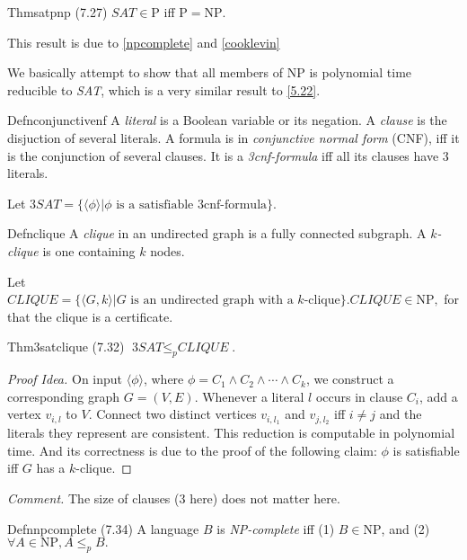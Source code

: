 \begin{reference}{Thm}{satpnp}
  (7.27) $\textit{SAT}\in \mathrm{P}$ iff $\mathrm{P}=\mathrm{NP}$.
\end{reference}

This result is due to \ref{npcomplete} and \ref{cooklevin}

We basically attempt to show that all members of NP is polynomial time reducible to \textit{SAT}, which is a very similar result to \ref{5.22}.

\begin{reference}{Defn}{conjunctivenf}
  A \emph{literal} is a Boolean variable or its negation. A \emph{clause} is the disjuction of several literals. A formula is in \emph{conjunctive normal form} (CNF), iff it is the conjunction of several clauses. It is a \emph{3cnf-formula} iff all its clauses have 3 literals.
\end{reference}

Let $\textit{3SAT}=\{\langle \phi\rangle|\phi\text{ is a satisfiable 3cnf-formula}\}$.

\begin{reference}{Defn}{clique}
  A \emph{clique} in an undirected graph is a fully connected subgraph. A \emph{$k$-clique} is one containing $k$ nodes.
\end{reference}

Let $\textit{CLIQUE}=\{\langle G,k\rangle|G\text{ is an undirected graph with a $k$-clique}\}. \textit{CLIQUE}\in \mathrm{NP},$ for that the clique is a certificate.

\begin{reference}{Thm}{3satclique}
  (7.32) $\textit{3SAT}\leq_p \textit{CLIQUE}$.
\end{reference}

\begin{proof}[Proof Idea]
  On input $\langle \phi\rangle$, where $\phi=C_1\wedge C_2\wedge\cdots\wedge C_k$, we construct a corresponding graph $G=(V,E)$. Whenever a literal $l$ occurs in clause $C_i$, add a vertex $v_{i,l}$ to $V$. Connect two distinct vertices $v_{i,l_1}$ and $v_{j,l_2}$ iff $i\neq j$ and the literals they represent are consistent. This reduction is computable in polynomial time. And its correctness is due to the proof of the following claim: $\phi$ is satisfiable iff $G$ has a $k$-clique.
\end{proof}

\textit{Comment.} The size of clauses (3 here) does not matter here.

\begin{reference}{Defn}{npcomplete}
  (7.34) A language \( B \) is \emph{NP-complete} iff (1) \( B\in \mathrm{NP} \), and (2) $\forall A\in \mathrm{NP}, A\leq_p B.$
\end{reference}

